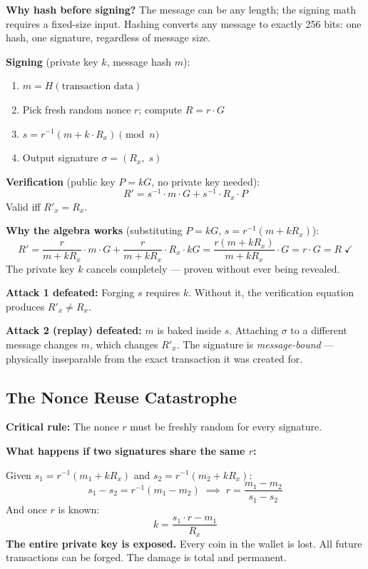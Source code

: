 \documentclass[12pt, a4paper]{article}
\begin{document}
\textbf{Why hash before signing?} The message can be any length; the signing
math requires a fixed-size input. Hashing converts any message to exactly 256
bits: one hash, one signature, regardless of message size.

\textbf{Signing} (private key $k$, message hash $m$):
\begin{enumerate}
    \item $m = H(\text{transaction data})$
    \item Pick fresh random nonce $r$; compute $R = r \cdot G$
    \item $\displaystyle s = r^{-1}(m + k \cdot R_x) \pmod{n}$
    \item Output signature $\sigma = (R_x,\; s)$
\end{enumerate}

\textbf{Verification} (public key $P = kG$, no private key needed):
\[
    R' = s^{-1} \cdot m \cdot G + s^{-1} \cdot R_x \cdot P
\]
Valid iff $R'_x = R_x$.

\textbf{Why the algebra works} (substituting $P = kG$,
$s = r^{-1}(m + kR_x)$):
\[
    R' = \frac{r}{m+kR_x}\cdot m \cdot G + \frac{r}{m+kR_x} \cdot R_x \cdot kG
       = \frac{r(m + kR_x)}{m+kR_x} \cdot G = r \cdot G = R \;\checkmark
\]
The private key $k$ cancels completely --- proven without ever being revealed.

\textbf{Attack 1 defeated:} Forging $s$ requires $k$. Without it, the
verification equation produces $R'_x \neq R_x$.

\textbf{Attack 2 (replay) defeated:} $m$ is baked inside $s$. Attaching
$\sigma$ to a different message changes $m$, which changes $R'_x$. The
signature is \emph{message-bound} --- physically inseparable from the exact
transaction it was created for.

\subsection{The Nonce Reuse Catastrophe}

\textbf{Critical rule:} The nonce $r$ must be freshly random for every signature.

\textbf{What happens if two signatures share the same $r$:}

Given $s_1 = r^{-1}(m_1 + k R_x)$ and $s_2 = r^{-1}(m_2 + k R_x)$:
\[
    s_1 - s_2 = r^{-1}(m_1 - m_2)
    \;\implies\;
    r = \frac{m_1 - m_2}{s_1 - s_2}
\]
And once $r$ is known:
\[
    k = \frac{s_1 \cdot r - m_1}{R_x}
\]
\textbf{The entire private key is exposed.} Every coin in the wallet is lost.
All future transactions can be forged. The damage is total and permanent.
\end{document}

